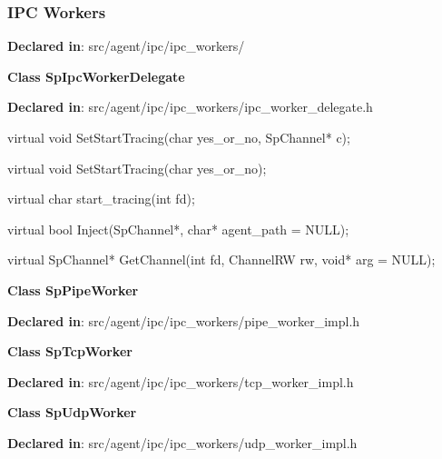 \subsubsection{IPC Workers}
\textbf{Declared in}: src/agent/ipc/ipc\_workers/

\textbf{Class SpIpcWorkerDelegate}

\textbf{Declared in}: src/agent/ipc/ipc\_workers/ipc\_worker\_delegate.h

\begin{apient}
virtual void SetStartTracing(char yes_or_no,
                             SpChannel* c);
\end{apient}
\apidesc{
}

\begin{apient}
virtual void SetStartTracing(char yes_or_no);
\end{apient}
\apidesc{
}

\begin{apient}
virtual char start_tracing(int fd);
\end{apient}
\apidesc{
}

\begin{apient}
virtual bool Inject(SpChannel*, char* agent_path = NULL);
\end{apient}
\apidesc{
}

\begin{apient}
virtual SpChannel* GetChannel(int fd,
                              ChannelRW rw,
                              void* arg = NULL);
\end{apient}
\apidesc{
}

\textbf{Class SpPipeWorker}

\textbf{Declared in}: src/agent/ipc/ipc\_workers/pipe\_worker\_impl.h

\textbf{Class SpTcpWorker}

\textbf{Declared in}: src/agent/ipc/ipc\_workers/tcp\_worker\_impl.h

\textbf{Class SpUdpWorker}

\textbf{Declared in}: src/agent/ipc/ipc\_workers/udp\_worker\_impl.h
